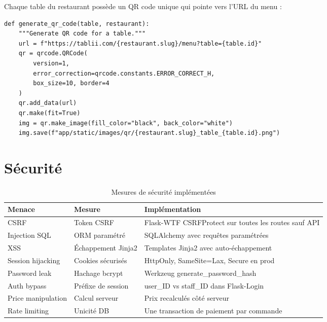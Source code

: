 \documentclass[12pt,a4paper]{report}
\begin{document}
Chaque table du restaurant possède un QR code unique qui pointe vers l'URL du menu :

\begin{codebox}
\begin{lstlisting}
def generate_qr_code(table, restaurant):
    """Generate QR code for a table."""
    url = f"https://tablii.com/{restaurant.slug}/menu?table={table.id}"
    qr = qrcode.QRCode(
        version=1,
        error_correction=qrcode.constants.ERROR_CORRECT_H,
        box_size=10, border=4
    )
    qr.add_data(url)
    qr.make(fit=True)
    img = qr.make_image(fill_color="black", back_color="white")
    img.save(f"app/static/images/qr/{restaurant.slug}_table_{table.id}.png")
\end{lstlisting}
\end{codebox}

\section{Sécurité}

\begin{table}[H]
    \centering
    \caption{Mesures de sécurité implémentées}
    \label{tab:security}
    \begin{tabularx}{\textwidth}{lXp{}}
        \toprule
        \textbf{Menace} & \textbf{Mesure} & \textbf{Implémentation} \\
        \midrule
        CSRF & Token CSRF & Flask-WTF CSRFProtect sur toutes les routes sauf API \\
        Injection SQL & ORM paramétré & SQLAlchemy avec requêtes paramétrées \\
        XSS & Échappement Jinja2 & Templates Jinja2 avec auto-échappement \\
        Session hijacking & Cookies sécurisés & HttpOnly, SameSite=Lax, Secure en prod \\
        Password leak & Hachage bcrypt & Werkzeug generate\_password\_hash \\
        Auth bypass & Préfixe de session & user\_ID vs staff\_ID dans Flask-Login \\
        Price manipulation & Calcul serveur & Prix recalculés côté serveur \\
        Rate limiting & Unicité DB & Une transaction de paiement par commande \\
        \bottomrule
    \end{tabularx}
\end{table}
\end{document}
